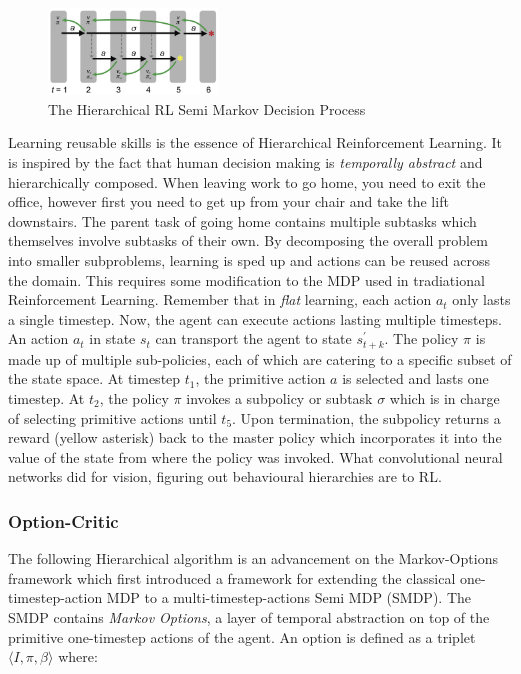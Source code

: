 \documentclass[notitlepage,a4paper,11pt]{article}
\begin{document}
\begin{figure}
	\vspace{-20pt}
	\begin{center}
		\includegraphics[width=0.4\textwidth]{figs/hrl_smdp.png}
	\end{center}
	\vspace{-20pt}
\caption{The Hierarchical RL Semi Markov Decision Process \protect\cite{ribas2011neural}} \label{fig:4}
\end{figure}

Learning reusable skills is the essence of Hierarchical Reinforcement Learning. It is inspired by the fact that human decision making is \textit{temporally abstract} \cite{sutton1999between} and hierarchically composed. When leaving work to go home, you need to exit the office, however first you need to get up from your chair and take the lift downstairs. The parent task of going home contains multiple subtasks which themselves involve subtasks of their own. By decomposing the overall problem into smaller subproblems, learning is sped up and actions can be reused across the domain. This requires some modification to the MDP used in tradiational Reinforcement Learning. Remember that in \textit{flat} learning, each action $a_t$ only lasts a single timestep. Now, the agent can execute actions lasting multiple timesteps. An action $a_t$ in state $s_t$ can transport the agent to state $s^{\prime}_{t+k}$. The policy $\pi$ is made up of multiple sub-policies, each of which are catering to a specific subset of the state space. At timestep $t_1$, the primitive action $a$ is selected and lasts one timestep. At $t_2$, the policy $\pi$ invokes a subpolicy or subtask $\sigma$ which is in charge of selecting primitive actions until $t_5$. Upon termination, the subpolicy returns a reward (yellow asterisk) back to the master policy which incorporates it into the value of the state from where the policy was invoked. What convolutional neural networks did for vision, figuring out behavioural hierarchies are to RL.

\subsubsection{Option-Critic}
The following Hierarchical algorithm is an advancement on the Markov-Options framework \cite{sutton1999between} which first introduced a framework for extending the classical one-timestep-action MDP to a multi-timestep-actions Semi MDP (SMDP). The SMDP contains \textit{Markov Options}, a layer of temporal abstraction on top of the primitive one-timestep actions of the agent. An option is defined as a triplet $\langle I, \pi, \beta \rangle$ where:
\end{document}
